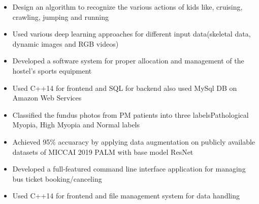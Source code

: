 \documentclass[10pt,a4paper]{altacv}
\begin{document}



\begin{itemize}
\item Design an algorithm to recognize the various actions of kids like, cruising, crawling, jumping and running
\item Used various deep learning approaches for different input data(skeletal data, dynamic images and RGB videos)
\end{itemize}


\begin{itemize}
\item Developed a software system for proper allocation and management of the hostel’s sports equipment
\item Used C++14 for frontend and SQL for backend also used MySql DB on Amazon Web Services
\end{itemize}

\begin{itemize}
\item Classified the fundus photos from PM patients into three labelsPathological Myopia, High Myopia and Normal labels 
\item Achieved 95\% accuaracy by applying data augmentation on publicly available datasets of MICCAI 2019 PALM with base model ResNet
\end{itemize}

\begin{itemize}
\item Developed a full-featured command line interface application for managing bus ticket booking/canceling  
\item Used C++14 for frontend and file management system for data handling
\end{itemize}
\end{document}
